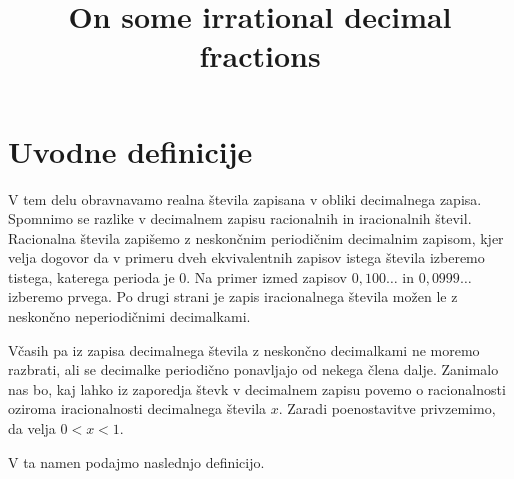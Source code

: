 \documentclass[twoside,11pt]{article}
\begin{document}




\klasifikacija{~} 


\title{On some irrational decimal fractions}



\glava\baselineskip=14.5pt

\smallskip


\section{Uvodne definicije}
V tem delu obravnavamo realna števila zapisana v obliki decimalnega zapisa.
Spomnimo se razlike v decimalnem zapisu racionalnih in iracionalnih števil.
Racionalna števila zapišemo z neskončnim periodičnim decimalnim zapisom, 
kjer velja dogovor da v primeru dveh ekvivalentnih zapisov istega števila izberemo tistega, katerega perioda je $0$.
Na primer izmed zapisov $0{,}100 \dots$ in $0{,}0999 \dots$ izberemo prvega. 
Po drugi strani je zapis iracionalnega števila možen 
le z neskončno neperiodičnimi decimalkami.

Včasih pa iz zapisa decimalnega števila z neskončno decimalkami ne moremo razbrati, ali 
se decimalke periodično ponavljajo od nekega člena dalje.
Zanimalo nas bo, kaj lahko iz zaporedja števk v decimalnem zapisu povemo o racionalnosti oziroma iracionalnosti
decimalnega števila $x$.
Zaradi poenostavitve privzemimo, da velja $ 0 < x < 1$.

V ta namen podajmo naslednjo definicijo.
\end{document}
